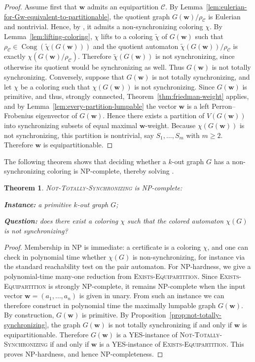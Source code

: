 \documentclass[a4paper,10pt]{amsart}
\theoremstyle{plain}
\newtheorem{theorem}{Theorem}[section]
\theoremstyle{definition}
\DeclareMathOperator{\Cong}{Cong}
\begin{document}
\begin{proof}
Assume first that $\mathbf w$ admits an equipartition $\mathcal C$. By Lemma~\ref{lem:eulerian-for-Gw-equivalent-to-partitionable}, the quotient graph $G(\mathbf w)/\rho_{\mathcal C}$ is Eulerian and nontrivial. Hence, by \cite[Lemma~1]{Kari2003}, it admits a non-synchronizing coloring $\chi$. By Lemma~\ref{lem:lifting-coloring}, $\chi$ lifts to a coloring $\widetilde\chi$ of $G(\mathbf w)$ such that $\rho_{\mathcal C}\in\Cong(\widetilde\chi(G(\mathbf w)))$ and the quotient automaton $\widetilde\chi(G(\mathbf w))/\rho_{\mathcal C}$ is exactly $\chi(G(\mathbf w)/\rho_{\mathcal C})$. Therefore $\widetilde\chi(G(\mathbf w))$ is not synchronizing, since otherwise its quotient would be synchronizing as well. Thus $G(\mathbf w)$ is not totally synchronizing. Conversely, suppose that $G(\mathbf w)$ is not totally synchronizing, and let $\chi$ be a coloring such that $\chi(G(\mathbf w))$ is not synchronizing. Since $G(\mathbf w)$ is primitive, and thus, strongly connected, Theorem~\ref{thm:friedman-weight} applies, and by Lemma~\ref{lem:every-partition-lumpable} the vector $\mathbf w$ is a left Perron--Frobenius eigenvector of $G(\mathbf w)$. Hence there exists a partition of $V(G(\mathbf w))$ into synchronizing subsets of equal maximal $\mathbf w$-weight. Because $\chi(G(\mathbf w))$ is not synchronizing, this partition is nontrivial, say $S_1,\dots,S_m$ with $m\ge 2$. Therefore $\mathbf w$ is equipartitionable.
\end{proof}
The following theorem shows that deciding whether a $k$-out graph $G$ has a non-synchronizing coloring is NP-complete, thereby solving \cite[Problem~1]{GusevSzykula15}.
\begin{theorem}\label{thm:NTS-NPcomplete}
\textsc{Not-Totally-Synchronizing} is NP-complete:

\smallskip
\noindent\textbf{Instance:} a primitive $k$-out graph $G$;

\noindent\textbf{Question:} does there exist a coloring $\chi$ such that the colored automaton $\chi(G)$ is not synchronizing?
\end{theorem}
\begin{proof}
Membership in NP is immediate: a certificate is a coloring $\chi$, and one can check in polynomial time whether $\chi(G)$ is non-synchronizing, for instance via the standard reachability test on the pair automaton.
For NP-hardness, we give a polynomial-time many-one reduction from \textsc{Exists-Equipartition}. Since \textsc{Exists-Equipartition} is strongly NP-complete, it remains NP-complete when the input vector $\mathbf w=(a_1,\dots,a_n)$ is given in unary. From such an instance we can therefore construct in polynomial time the maximally lumpable graph $G(\mathbf w)$. By construction, $G(\mathbf w)$ is primitive. By Proposition~\ref{prop:not-totally-synchronizing}, the graph $G(\mathbf w)$ is not totally synchronizing if and only if $\mathbf w$ is equipartitionable. Therefore $G(\mathbf w)$ is a YES-instance of \textsc{Not-Totally-Synchronizing} if and only if $\mathbf w$ is a YES-instance of \textsc{Exists-Equipartition}. This proves NP-hardness, and hence NP-completeness.
\end{proof}
\end{document}

